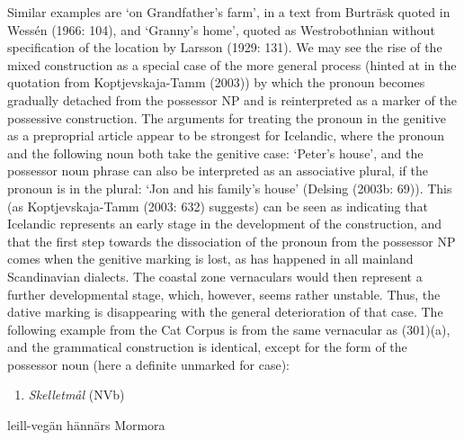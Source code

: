 Similar examples are  ‘on Grandfather’s farm’, in a text from Burträsk quoted in Wessén (1966: 104), and  ‘Granny’s home’, quoted as Westrobothnian without specification of the location by Larsson (1929: 131). We may see the rise of the mixed construction as a special case of the more general process (hinted at in the quotation from Koptjevskaja-Tamm (2003)) by which the pronoun becomes gradually detached from the possessor NP and is reinterpreted as a marker of the possessive construction. The arguments for treating the pronoun in the genitive as a preproprial article appear to be strongest for Icelandic, where the pronoun and the following noun both take the genitive case: ‘Peter’s house’, and the possessor noun phrase can also be interpreted as an associative plural, if the pronoun is in the plural:  ‘Jon and his family’s house’ (Delsing (2003b: 69)). This (as Koptjevskaja-Tamm (2003: 632) suggests) can be seen as indicating that Icelandic represents an early stage in the development of the construction, and that the first step towards the dissociation of the pronoun from the possessor NP comes when the genitive marking is lost, as has happened in all mainland Scandinavian dialects. The coastal zone vernaculars would then represent a further developmental stage, which, however, seems rather unstable. Thus, the dative marking is disappearing with the general deterioration of that case. The following example from the Cat Corpus is from the same vernacular as (301)(a), and the grammatical construction is identical, except for the form of the possessor noun (here a definite unmarked for case): 

\begin{enumerate} %
\item 
\textit{Skelletmål } (NVb)
\end{enumerate} %
\ea\label{}
\gll leill-vegän  hännärs  Mormora\\


